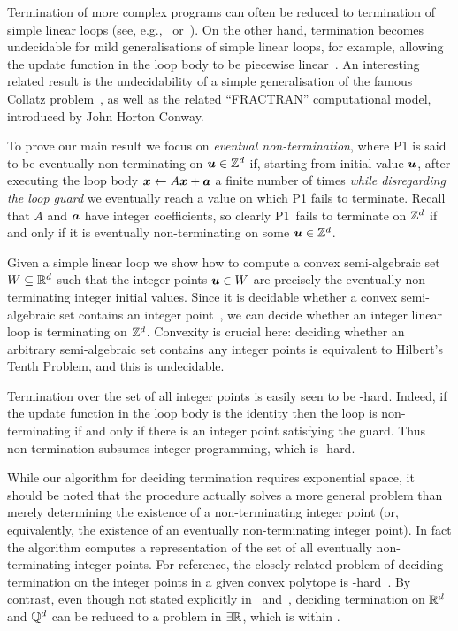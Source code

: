 Termination of more complex programs can often be reduced to
termination of simple linear loops (see, e.g.,~\cite{CookPR06}
or~\cite[Section 6]{Tiw04}).  On the other hand, termination becomes
undecidable for mild generalisations of simple linear loops, for
example, allowing the update function in the loop body to be piecewise
linear~\cite{BGM12}. An interesting related result is the undecidability
of a simple generalisation of the famous Collatz problem~\cite{GeneralisedCollatz},
as well as the related ``FRACTRAN'' computational model, introduced by John Horton Conway.

To prove our main result we focus on \emph{eventual non-termination},
where \textsf{P1} is said to be eventually non-terminating on
$\boldsymbol{u} \in \mathbb{Z}^{d}$ if, starting from initial value
$\boldsymbol{u}$, after executing the loop body $\boldsymbol{x} \gets
A\boldsymbol{x}+\boldsymbol{a}$ a finite number of times \emph{while
  disregarding the loop guard} we eventually reach a value on which
\textsf{P1} fails to terminate.  Recall that $A$ and $\boldsymbol{a}$
have integer coefficients, so clearly \textsf{P1}~fails to
terminate on $\mathbb{Z}^{d}$ if and only if it is eventually
non-terminating on some $\boldsymbol{u} \in \mathbb{Z}^{d}$.

Given a simple linear loop we show how to compute a convex
semi-algebraic set $W \subseteq \mathbb{R}^{d}$ such that the integer
points $\boldsymbol{u} \in W$ are precisely the eventually
non-terminating integer initial values.  Since it is decidable whether
a convex semi-algebraic set contains an integer
point~\cite{KhachiyanP97}, we can
decide whether an integer linear loop is terminating on
$\mathbb{Z}^{d}$. Convexity is crucial here: deciding whether an arbitrary
semi-algebraic set contains any integer points is equivalent to
Hilbert's Tenth Problem, and this is undecidable.

Termination over the set of all integer points is easily seen to be
\coNP-hard.  Indeed, if the update function in the loop body
is the identity then the loop is non-terminating if and only if there
is an integer point satisfying the guard.  Thus non-termination
subsumes integer programming, which is \NP-hard.

While our algorithm for deciding termination requires exponential
space, it should be noted that the procedure actually solves a more
general problem than merely determining the existence of a
non-terminating integer point (or, equivalently, the existence of an
eventually non-terminating integer point).  In fact the algorithm
computes a representation of the set of all eventually non-terminating
integer points.  For reference, the closely related problem of
deciding termination on the integer points in a given convex polytope is
\EXPSPACE{}-hard~\cite{BGM12}. By contrast, even though not stated explicitly in~\cite{Tiw04} and~\cite{Bra06}, deciding termination on $\mathbb{R}^{d}$ and $\mathbb{Q}^{d}$ can be reduced to a problem in $\exists \mathbb{R}$, which is within \PSPACE{}.

